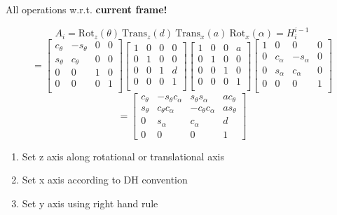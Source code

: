     
    
        \begin{center}
            All operations w.r.t. \textbf{current frame!}
        \end{center}
        $$\boxed{
            A_i = \textrm{Rot}_z(\theta)\ \textrm{Trans}_z(d)\ \textrm{Trans}_x(a)\ \textrm{Rot}_x(\alpha) = H_i^{i-1}
        }$$
        {\scriptsize
        $$
            =
            \begin{bmatrix}
                c_\theta & -s_\theta & 0 & 0\\
                s_\theta & c_\theta & 0 & 0\\
                0 & 0 & 1 & 0\\
                0 & 0 & 0 & 1\\
            \end{bmatrix}\!\!
            \begin{bmatrix}
                1 & 0 & 0 & 0\\
                0 & 1 & 0 & 0\\
                0 & 0 & 1 & d\\
                0 & 0 & 0 & 1\\
            \end{bmatrix}\!\!
            \begin{bmatrix}
                1 & 0 & 0 & a\\
                0 & 1 & 0 & 0\\
                0 & 0 & 1 & 0\\
                0 & 0 & 0 & 1\\
            \end{bmatrix}\!\!
            \begin{bmatrix}
                1 & 0 & 0 & 0\\
                0 & c_\alpha & -s_\alpha & 0\\
                0 & s_\alpha & c_\alpha & 0\\
                0 & 0 & 0 & 1\\
            \end{bmatrix}
        $$
        $$
            = 
            \begin{bmatrix}
                c_\theta & -s_\theta c_\alpha &  s_\theta s_\alpha & a c_\theta\\
                s_\theta &  c_\theta c_\alpha & -c_\theta c_\alpha & a s_\theta\\
                0        &  s_\alpha          &  c_\alpha          & d\\
                0        &  0                 &  0                 & 1
            \end{bmatrix}
        $$}
            \begin{enumerate}
                \item Set z axis along rotational or translational axis
                \item Set x axis according to DH convention
                \item Set y axis using right hand rule
            \end{enumerate}
        
